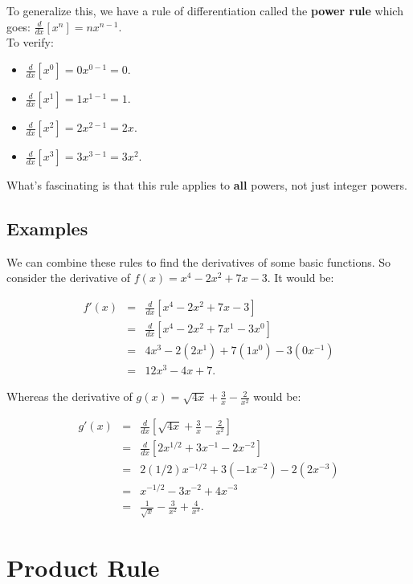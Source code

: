 To generalize this, we have a rule of differentiation called the \textbf{ power rule} which goes: $\frac{d}{dx}[x^n]=nx^{n-1}$. \\ 

To verify:

\begin{itemize}
\item $\frac{d}{dx}[x^0]=0x^{0-1}=0$.
\item $\frac{d}{dx}[x^1]=1x^{1-1}=1$.
\item $\frac{d}{dx}[x^2]=2x^{2-1}=2x$.
\item $\frac{d}{dx}[x^3]=3x^{3-1}=3x^2$.
\end{itemize}

What's fascinating is that this rule applies to \textbf{ all} powers, not just integer powers.


\subsection{Examples}

We can combine these rules to find the derivatives of some basic functions.  So consider the derivative of $f(x)=x^4-2x^2+7x-3$.  It would be:

\begin{eqnarray*}
f'(x)&=&\frac{d}{dx}[x^4-2x^2+7x-3]\\
&=&\frac{d}{dx}[x^4-2x^2+7x^1-3x^0]\\
&=&4x^3-2(2x^1)+7(1x^0)-3(0x^{-1})\\
&=&12x^3-4x+7.
\end{eqnarray*}

Whereas the derivative of $g(x)=\sqrt{4x}+\frac{3}{x}-\frac{2}{x^2}$ would be:

\begin{eqnarray*}
g'(x)&=&\frac{d}{dx}[\sqrt{4x}+\frac{3}{x}-\frac{2}{x^2}]\\
&=&\frac{d}{dx}[2x^{1/2}+3x^{-1}-2x^{-2}]\\
&=&2(1/2)x^{-1/2}+3(-1x^{-2})-2(2x^{-3})\\
&=&x^{-1/2}-3x^{-2}+4x^{-3}\\
&=&\frac{1}{\sqrt{x}}-\frac{3}{x^2}+\frac{4}{x^3}.
\end{eqnarray*}



\section{Product Rule}\label{Section:ProductRule}

